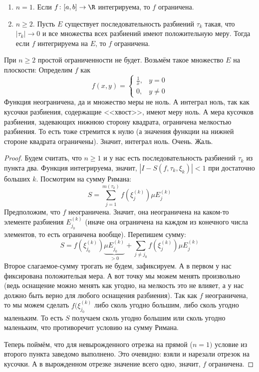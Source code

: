 \begin{theorem}
	\begin{enumerate}
	\item $n=1$. Если $f \colon [a,b] \to \R$ интегрируема, то $f$ ограничена.
	\item
		$n \ge 2$. Пусть $E$ существует последовательность разбиений $\tau_k$ такая, что
		$|\tau_k| \to 0$ и все множества всех разбиений имеют положительную меру.
		Тогда если $f$ интегрируема на $E$, то $f$ ограничена.
	\end{enumerate}
\end{theorem}
\begin{Rem}
	При $n \ge 2$ простой ограниченности не будет.
	Возьмём такое множество $E$ на плоскости:
	Определим $f$ как
	\[
		f(x, y) =
		\begin{cases}
			\frac 1 x, & y=0\\
			0,         & y\neq 0
		\end{cases}
	\]
	Функция неограничена, да и множество меры не ноль.
	А интеграл ноль, так как кусочки разбиения, содержащие <<хвост>>, имеют меру ноль.
	А мера кусочков разбиения, задевающих нижнюю сторону квадрата, ограничена мелкостью разбиения.
	То есть тоже стремится к нулю (а значения функции на нижней стороне квадрата ограничены).
	Значит, интеграл ноль.
	Очень. Жаль.
\end{Rem}
\begin{proof}
	Будем считать, что $n\ge 1$ и у нас есть последовательность разбиений $\tau_k$ из пункта два.
	Функция интегрируема, значит, $|I-S(f,\tau_k,\xi_k)|<1$ при достаточно больших $k$.
	Посмотрим на сумму Римана:
	\[
		S=\sum_{j=1}^{m(\tau_k)} f(\xi_j^{(k)}) \mu E_j^{(k)}
	\]
	Предположим, что $f$ неограничена.
	Значит, она неограничена на каком-то элементе разбиения $E_{j_0}^{(k)}$
	(иначе она ограничена на каждом из конечного числа элементов, то есть ограничена вообще).
	Перепишем сумму:
	\[
		S=f(\xi_{j_0}^{(k)}) \underbrace{\mu E_{j_0}^{(k)}}_{>0} + \sum_{j\neq j_0} f(\xi_j^{(k)}) \mu E_j^{(k)}
	\]
	Второе слагаемое-сумму трогать не будем, зафиксируем.
	А в первом у нас фиксирована положительая мера.
	А вот точку мы можем менять произвольно (ведь оснащение можно менять как угодно, на мелкость это не влияет,
	а у нас должно быть верно для любого оснащения разбиения).
	Так как $f$ неограничена, то мы можем сделать $f(\xi_{j_0}^{(k)}$ либо сколь угодно большим,
	либо сколь угодно маленьким.
	То есть $S$ получаем сколь угодно большим или сколь угодно маленьким, что противоречит условию на сумму Римана.

	Теперь поймём, что для невырожденного отрезка на прямой ($n=1)$ условие из второго пункта заведомо выполнено.
	Это очевидно: взяли и нарезали отрезок на кусочки.
	А в вырожденном отрезке значение всего одно, значит, $f$ ограничена.
\end{proof}
